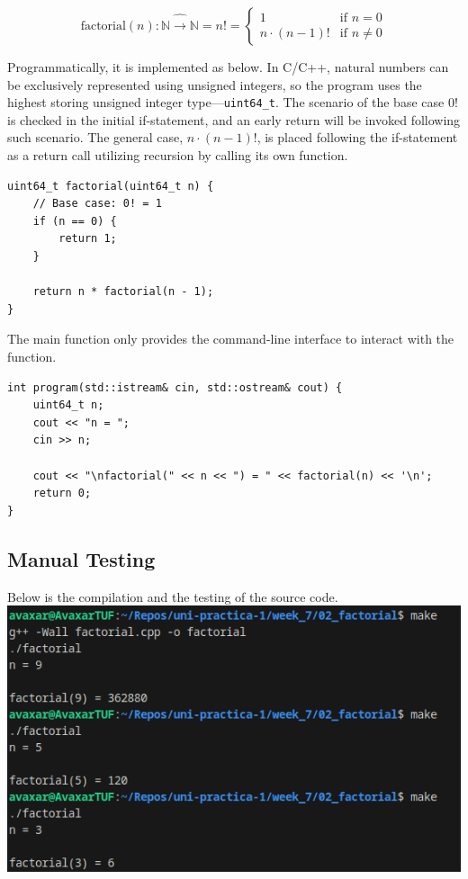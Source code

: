 \documentclass[12pt]{article}
\begin{document}
$$
\text{factorial}(n) : \mathbb{N} \hat \rightarrow \mathbb{N} = n! = \begin{cases}
1 & \text{if } n = 0 \\
n \cdot (n - 1)! & \text{if } n \neq 0
\end{cases}
$$

Programmatically, it is implemented as below. In C/C++, natural numbers can be exclusively represented using unsigned integers, so the program uses the highest storing unsigned integer type---\texttt{uint64\_t}. The scenario of the base case $0!$ is checked in the initial if-statement, and an early return will be invoked following such scenario. The general case, $n \cdot (n - 1)!$, is placed following the if-statement as a return call utilizing recursion by calling its own function.

\begin{verbatim}
uint64_t factorial(uint64_t n) {
    // Base case: 0! = 1
    if (n == 0) {
        return 1;
    }

    return n * factorial(n - 1);
}
\end{verbatim}

The main function only provides the command-line interface to interact with the function.

\begin{verbatim}
int program(std::istream& cin, std::ostream& cout) {
    uint64_t n;
    cout << "n = ";
    cin >> n;

    cout << "\nfactorial(" << n << ") = " << factorial(n) << '\n';
    return 0;
}
\end{verbatim}

\pagebreak
\subsection{Manual Testing}
Below is the compilation and the testing of the source code.
\newline\includegraphics[width=\textwidth]{02_factorial}
\end{document}
